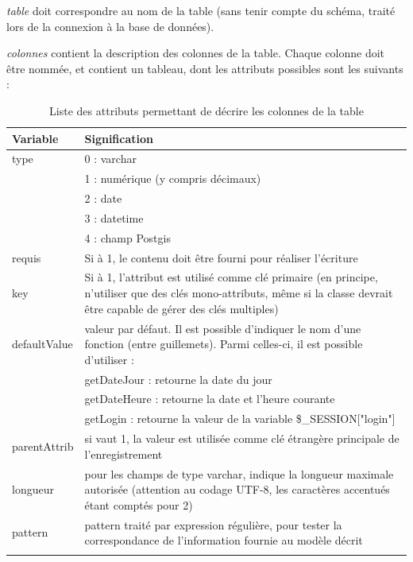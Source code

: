 \textit{table} doit correspondre au nom de la table (sans tenir compte du schéma, traité lors de la connexion à la base de données).

\textit{colonnes} contient la description des colonnes de la table. Chaque colonne doit être nommée, et contient un tableau, dont les  attributs possibles sont les suivants :

\begin{longtable}{|p{3cm}|p{10cm}|}
\hline
\textbf{Variable} & \textbf{Signification} \\
\hline
\endhead
\hline\endfoot\endlastfoot
type & 0 : varchar \\
& 1 : numérique (y compris décimaux) \\
& 2 : date \\
& 3 : datetime \\
& 4 : champ Postgis \\

requis & Si à 1, le contenu doit être fourni pour réaliser l'écriture \\

key & Si à 1, l'attribut est utilisé comme clé primaire (en principe, n'utiliser que des clés mono-attributs, même si la classe devrait être capable de gérer des clés multiples) \\

defaultValue & valeur par défaut. Il est possible d'indiquer le nom d'une fonction (entre guillemets). Parmi celles-ci, il est possible d'utiliser :\\
& getDateJour : retourne la date du jour \\
& getDateHeure : retourne la date et l'heure courante \\
& getLogin : retourne la valeur de la variable \$\_SESSION["login"]\\

parentAttrib & si vaut 1, la valeur est utilisée comme clé étrangère principale de l'enregistrement \\

longueur & pour les champs de type varchar, indique la longueur maximale autorisée (attention au codage UTF-8, les caractères accentués étant comptés pour 2) \\

pattern & pattern traité par expression régulière, pour tester la correspondance de l'information fournie au modèle décrit \\
\hline

\caption{Liste des attributs permettant de décrire les colonnes de la table\label{objetbdd-attr}}

\end{longtable}

